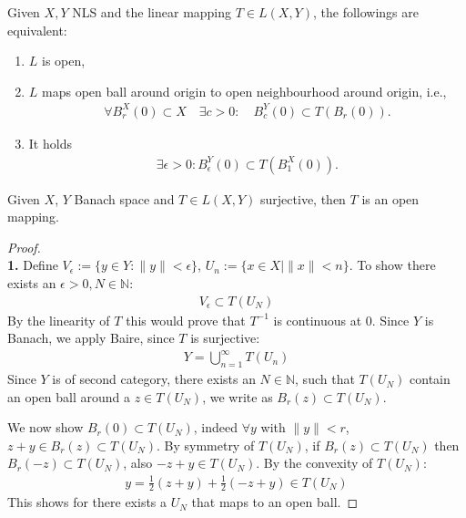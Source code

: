 \begin{lemma}[characterization]
	Given $X, Y$ NLS and the linear mapping $T \in L(X, Y)$, the followings are equivalent:
	\begin{enumerate}
		\item $L$ is open, 
		\item $L$ maps open ball around origin to open neighbourhood around origin, i.e., 
		\begin{align*}
			\forall B^X_r(0) \subset X \quad \exists c>0: \quad B^Y_c(0) \subset T(B_r(0)). 
		\end{align*}
		\item It holds
		\begin{align*}
			\exists \epsilon > 0: B_\epsilon^Y(0) \subset T(B_1^X(0)).
		\end{align*}
	\end{enumerate}
\end{lemma}

\begin{theorem}
	Given $X$, $Y$ Banach space and $T\in L(X,Y)$ surjective, then $T$ is an open mapping.
\end{theorem}
\begin{proof}\quad\\
\textbf{1.} Define $V_\epsilon:= \{y \in Y: \|y\| < \epsilon\}$, $U_n := \{x \in X| \|x\| < n\}$.  To show there exists an $\epsilon > 0, N \in \mathbb{N}:$
\begin{align*}
	V_\epsilon \subset T(U_N)
\end{align*}
By the linearity of $T$ this would prove that $T^{-1}$ is continuous at 0. 
Since $Y$ is Banach, we apply Baire, since $T$ is surjective:
\begin{align*}
	Y = \bigcup_{n = 1}^\infty T(U_n)
\end{align*}
Since $Y$ is of second category, there exists an $N \in \mathbb{N}$, such that $T(U_N)$ contain an open ball around a $z \in T(U_N)$, we write as $B_r(z) \subset T(U_N)$.\par
We now show $B_r(0) \subset T(U_N)$, indeed $\forall y$ with $\|y\| < r$, $z+y \in B_r(z) \subset T(U_N)$. By symmetry of $T(U_N)$, if $B_r(z) \subset T(U_N)$ then $B_r(-z) \subset T(U_N)$, also $-z + y \in T(U_N)$. By the convexity of $T(U_N)$:
\begin{align*}
	y= \frac{1}{2}(z + y) + \frac{1}{2}(-z + y) \in T(U_N)
\end{align*}
	This shows for there exists a $U_N$ that maps to an open ball. 
\end{proof}

